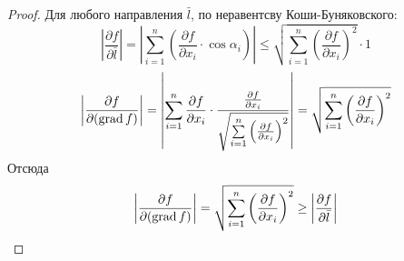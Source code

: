 \begin{proof}
    Для любого направления $\bar{l}$, по неравентсву Коши-Буняковского:
    \[\left|\frac{\partial {f}}{\partial {\bar{l}}}\right|=\left|\sum\limits_{i=1}^{n}\left(\frac{\partial {f}}{\partial {x_i}}\cdot \cos{\alpha_i}\right)\right|\leq \sqrt{\sum\limits_{i=1}^{n}\left(\frac{\partial {f}}{\partial {x_i}}\right)^2}\cdot 1\]
    \[\left|\frac{\partial {f}}{\partial {(\operatorname*{grad}{f})}}\right|=\left|\sum\limits_{i=1}^{n}\frac{\partial {f}}{\partial {x_i}}\cdot \frac{\frac{\partial {f}}{\partial {x_i}}}{\sqrt{\sum\limits_{i=1}^{n}\left(\frac{\partial {f}}{\partial {x_i}}\right)^2}}\right|=\sqrt{\sum\limits_{i=1}^{n}\left(\frac{\partial {f}}{\partial {x_i}}\right)^2}\]
    Отсюда
    \[\left|\frac{\partial {f}}{\partial {(\operatorname*{grad}{f})}}\right|=\sqrt{\sum\limits_{i=1}^{n}\left(\frac{\partial {f}}{\partial {x_i}}\right)^2}\geq \left|\frac{\partial {f}}{\partial {\bar{l}}}\right|\]

\end{proof} 
